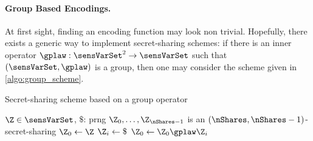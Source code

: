 \paragraph{Group Based Encodings.}
At first sight, finding an encoding function may look non trivial.
Hopefully, there exists a generic way to implement secret-sharing schemes: if there is an inner operator \(\gplaw: \sensVarSet^2 \rightarrow \sensVarSet\) such that \((\sensVarSet, \gplaw)\) is a group, then one may consider the scheme given in \autoref{algo:group_scheme}.
\begin{algorithm}
    \centering
    \caption{Secret-sharing scheme based on a group operator}
    \begin{algorithmic}
        \Require \(\Z \in \sensVarSet\), \(\$\): \gls{prng}
        \Ensure \(\Z_0, \ldots, \Z_{\nShares-1}\) is an \((\nShares, \nShares-1)\)-secret-sharing
        \State \(\Z_0 \gets \Z\)
            \State \(\Z_i \gets \$\)
            \State \(\Z_0 \gets \Z_0 \gplaw \Z_i\)
        \EndFor
    \end{algorithmic}
    \label{algo:group_scheme}
\end{algorithm}

